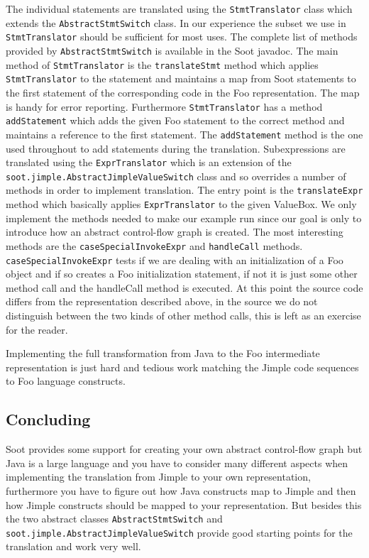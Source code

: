\documentclass{article}
\newcommand{\code}[1]{\texttt{\small #1}}
\begin{document}
The individual statements are translated using the
\code{StmtTranslator} class which extends the
\code{AbstractStmtSwitch} class. In our experience the subset we use
in \code{StmtTranslator} should be sufficient for most uses. The
complete list of methods provided by \code{AbstractStmtSwitch} is
available in the Soot javadoc.
%
The main method of \code{StmtTranslator} is the \code{translateStmt}
method which applies \code{StmtTranslator} to the statement and
maintains a map from Soot statements to the first statement of the
corresponding code in the Foo representation. The map is handy for
error reporting. Furthermore \code{StmtTranslator} has a method
\code{addStatement} which adds the given Foo statement to the correct
method and maintains a reference to the first statement. The
\code{addStatement} method is the one used throughout to add
statements during the translation.
%
Subexpressions are translated using the \code{ExprTranslator} which is
an extension of the \code{soot.jimple.AbstractJimpleValueSwitch} class
and so overrides a number of methods in order to implement
translation. The entry point is the \code{translateExpr} method which
basically applies \code{ExprTranslator} to the given ValueBox. We only
implement the methods needed to make our example run since our goal is
only to introduce how an abstract control-flow graph is created. The
most interesting methods are the \code{caseSpecialInvokeExpr} and
\code{handleCall} methods. \code{caseSpecialInvokeExpr} tests if we
are dealing with an initialization of a Foo object and if so creates a
Foo initialization statement, if not it is just some other method call
and the handleCall method is executed. At this point the source code
differs from the representation described above, in the source we do
not distinguish between the two kinds of other method calls, this is
left as an exercise for the reader.

Implementing the full transformation from Java to the Foo intermediate
representation is just hard and tedious work matching the Jimple code
sequences to Foo language constructs.

\subsection*{Concluding}
Soot provides some support for creating your own abstract control-flow
graph but Java is a large language and you have to consider many
different aspects when implementing the translation from Jimple to
your own representation, furthermore you have to figure out how Java
constructs map to Jimple and then how Jimple constructs should be
mapped to your representation. But besides this the two abstract
classes \code{AbstractStmtSwitch} and
\code{soot.jimple.\-AbstractJimpleValueSwitch} provide good starting
points for the translation and work very well.
\end{document}

